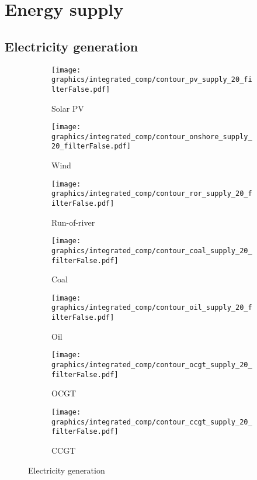 
\clearpage

\section{Energy supply}
\subsection{Electricity generation}

\begin{figure*}[h] %
    \centering
    \begin{subfigure}[b]{0.45\linewidth}
        \centering
        \texttt{[image: graphics/integrated\_comp/contour\_pv\_supply\_20\_filterFalse.pdf]}
        \caption{Solar PV}
    \end{subfigure}
    \hfill
    \begin{subfigure}[b]{0.45\linewidth}
        \centering
        \texttt{[image: graphics/integrated\_comp/contour\_onshore\_supply\_20\_filterFalse.pdf]}
        \caption{Wind}
    \end{subfigure}
    \hfill
    \begin{subfigure}[b]{0.45\linewidth}
        \centering
        \texttt{[image: graphics/integrated\_comp/contour\_ror\_supply\_20\_filterFalse.pdf]}
        \caption{Run-of-river}
    \end{subfigure}
    \hfill
    \begin{subfigure}[b]{0.45\linewidth}
        \centering
        \texttt{[image: graphics/integrated\_comp/contour\_coal\_supply\_20\_filterFalse.pdf]}
        \caption{Coal}
        \label{fig:coal-supply}
    \end{subfigure}
    \hfill
    \begin{subfigure}[b]{0.45\linewidth}
        \centering
        \texttt{[image: graphics/integrated\_comp/contour\_oil\_supply\_20\_filterFalse.pdf]}
        \caption{Oil}
    \end{subfigure}
    \hfill
    \begin{subfigure}[b]{0.45\linewidth}
        \centering
        \texttt{[image: graphics/integrated\_comp/contour\_ocgt\_supply\_20\_filterFalse.pdf]}
        \caption{OCGT}
    \end{subfigure}
    \hfill
    \begin{subfigure}[b]{0.45\linewidth}
        \centering
        \texttt{[image: graphics/integrated\_comp/contour\_ccgt\_supply\_20\_filterFalse.pdf]}
        \caption{CCGT}
    \end{subfigure}
    \hfill

    \caption{Electricity generation}
    \label{fig:supply}
\end{figure*}


